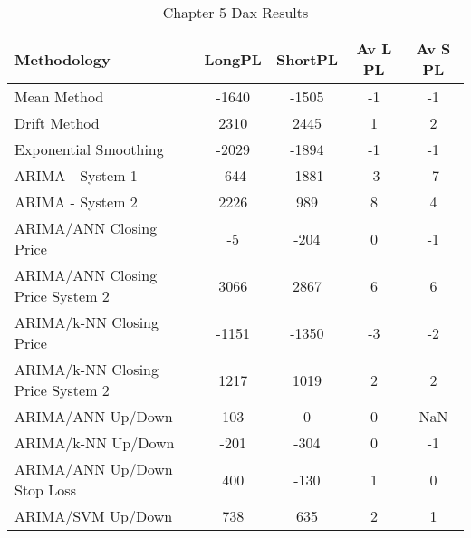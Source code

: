 \begin{table}[ht]
\centering
\caption[Chapter 5 Dax Results]{Chapter 5 Dax Results} 
\label{tab:chp6:dax2_summary}
\begin{tabular}{lcccc}
  \toprule Methodology & LongPL & ShortPL & Av L PL & Av S PL \\ 
  \midrule Mean Method & -1640 & -1505 & -1 & -1 \\ 
  Drift Method & 2310 & 2445 & 1 & 2 \\ 
  Exponential Smoothing & -2029 & -1894 & -1 & -1 \\ 
  ARIMA - System 1 & -644 & -1881 & -3 & -7 \\ 
  ARIMA - System 2 & 2226 & 989 & 8 & 4 \\ 
  ARIMA/ANN Closing Price & -5 & -204 & 0 & -1 \\ 
  ARIMA/ANN Closing Price System 2 & 3066 & 2867 & 6 & 6 \\ 
  ARIMA/k-NN Closing Price & -1151 & -1350 & -3 & -2 \\ 
  ARIMA/k-NN Closing Price System 2 & 1217 & 1019 & 2 & 2 \\ 
  ARIMA/ANN Up/Down & 103 & 0 & 0 & NaN \\ 
  ARIMA/k-NN Up/Down & -201 & -304 & 0 & -1 \\ 
  ARIMA/ANN Up/Down Stop Loss & 400 & -130 & 1 & 0 \\ 
  ARIMA/SVM Up/Down & 738 & 635 & 2 & 1 \\ 
   \bottomrule \end{tabular}
\end{table}
